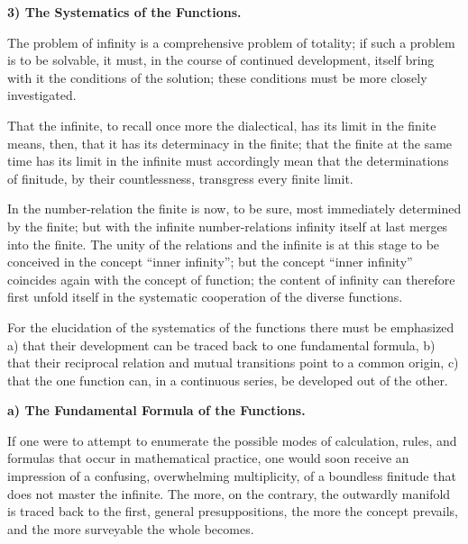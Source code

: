 \documentclass[12pt]{book}
\begin{document}
\begin{center}
\textbf{3) The Systematics of the Functions.}
\end{center}
{}

The problem of infinity is a comprehensive problem of totality; if such a problem
is to be solvable, it must, in the course of continued development, itself bring
with it the conditions of the solution; these conditions must be more closely
investigated.

That the infinite, to recall once more the dialectical, has its limit in the finite
means, then, that it has its determinacy in the finite; that the finite at the same
time has its limit in the infinite must accordingly mean that the determinations of
finitude, by their countlessness, transgress every finite limit.

In the number-relation the finite is now, to be sure, most immediately determined
by the finite; but with the infinite number-relations infinity itself at last
merges into the finite. The unity of the relations and the infinite is at this
stage to be conceived in the concept ``inner infinity''; but the concept ``inner
infinity'' coincides again with the concept of function; the content of infinity
can therefore first unfold itself in the systematic cooperation of the diverse
functions.

For the elucidation of the systematics of the functions there must be emphasized
a) that their development can be traced back to one fundamental formula, b) that
their reciprocal relation and mutual transitions point to a common origin, c) that
the one function can, in a continuous series, be developed out of the other.

\begin{center}
\textbf{a) The Fundamental Formula of the Functions.}
\end{center}
{}

If one were to attempt to enumerate the possible modes of calculation, rules, and
formulas that occur in mathematical practice, one would soon receive an impression
of a confusing, overwhelming multiplicity, of a boundless finitude that does not
master the infinite. The more, on the contrary, the outwardly manifold is traced
back to the first, general presuppositions, the more the concept prevails, and the
more surveyable the whole becomes.
\end{document}
